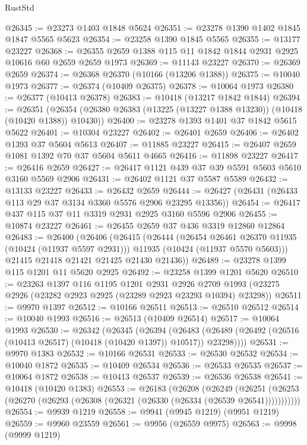 \begin{lexlean}{RustStd}
\begin{coremodule}
@26345 := @23273 @1403 @1848 @5624
@26351 := @23278 @1390 @1402 @1845 @1847 @5565 @5623
@26354 := @23258 @1390 @1845 @5565
@26355 := @13177 @23227
@26368 := @26355 @2659 @1388 @115 @11 @1842 @1844 @2931 @2925 @10616 @60 @2659 @2659 @1973
@26369 := @11143 @23227
@26370 := @26369 @2659
@26374 := @26368 @26370 (@10166 (@13206 @1388))
@26375 := @10040 @1973
@26377 := @26374 (@10409 @26375)
@26378 := @10064 @1973
@26380 := @26377 (@10413 @26378)
@26383 := @10418 (@13217 @1842 @1844)
@26394 := @26351
    (@26354 (@26380 @26383 (@13225 (@13227 @1388 @13230)) (@10418 (@10420 @1388)) @10430))
@26400 := @23278 @1393 @1401 @37 @1842 @5615 @5622
@26401 := @10304 @23227
@26402 := @26401 @2659
@26406 := @26402 @1393 @37 @5604 @5613
@26407 := @11885 @23227
@26415 := @26407 @2659 @1081 @1392 @70 @37 @5604 @5611 @4665
@26416 := @11898 @23227
@26417 := @26416 @2659
@26427 := @26417 @1121 @439 @37 @39 @5591 @5603 @5610 @3160 @5569 @2906
@26431 := @26402 @1121 @37 @5587 @5589
@26432 := @13133 @23227
@26433 := @26432 @2659
@26444 := @26427 (@26431 (@26433 @113 @29 @37 @3134 @3360 @5576 @2906 @23295 @13356))
@26454 := @26417 @437 @115 @37 @11 @3319 @2931 @2925 @3160 @5596 @2906
@26455 := @10874 @23227
@26461 := @26455 @2659 @37 @436 @3319 @12860 @12864
@26483 := @26400
    (@26406
      (@26415
        (@26444
          (@26454 @26461 @26370 @11935 (@10424 (@11937 @5597 @2931)))
          @11935
          (@10424 (@11937 @5570 @5603)))
        @21415
        @21418
        @21421
        @21425
        @21430
        @21436))
@26489 := @23278 @1399 @115 @1201 @11 @5620 @2925
@26492 := @23258 @1399 @1201 @5620
@26510 := @23263
    @1397
    @116
    @1195
    @1201
    @2931
    @2926
    @2709
    @1993
    (@23275 @2926 (@23282 @2923 @2925 (@23289 @2923 @23293 @10394) @23298))
@26511 := @9970 @1397
@26512 := @10166 @26511
@26513 := @26510 @26512
@26514 := @10040 @1993
@26516 := @26513 (@10409 @26514)
@26517 := @10064 @1993
@26530 := @26342
    (@26345
      (@26394
        (@26483 (@26489 (@26492 (@26516 (@10413 @26517) (@10418 (@10420 @1397)) @10517)) @23298))))
@26531 := @9970 @1383
@26532 := @10166 @26531
@26533 := @26530 @26532
@26534 := @10040 @1872
@26535 := @10409 @26534
@26536 := @26533 @26535
@26537 := @10064 @1872
@26538 := @10413 @26537
@26539 := @26536 @26538
@26541 := @10418 (@10420 @1383)
@26553 := @26183
    (@26208
      (@26249
        (@26251 (@26253 (@26270 (@26293 (@26308 (@26321 (@26330 (@26334 (@26539 @26541)))))))))))
@26554 := @9939 @1219
@26558 := @9941 (@9945 @1219) (@9951 @1219)
@26559 := @9960 @23559
@26561 := @9956 (@26559 @9975)
@26563 := @9998 (@9999 @1219)

\end{coremodule}
\end{lexlean}

